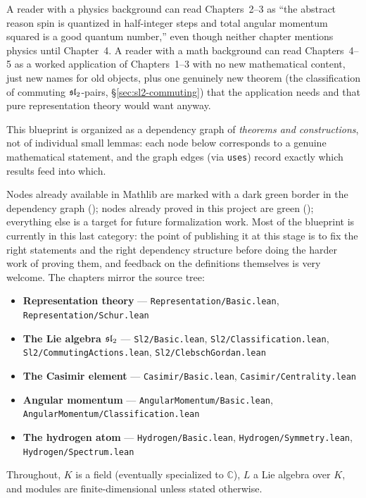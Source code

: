 A reader with a physics background can read Chapters~2--3 as ``the abstract
reason spin is quantized in half-integer steps and total angular momentum
squared is a good quantum number,'' even though neither chapter mentions
physics until Chapter~4. A reader with a math background can read Chapters~4--5
as a worked application of Chapters~1--3 with no new mathematical content,
just new names for old objects, plus one genuinely new theorem (the
classification of commuting $\mathfrak{sl}_2$-pairs, \S\ref{sec:sl2-commuting}) that
the application needs and that pure representation theory would want anyway.

This blueprint is organized as a dependency graph of \emph{theorems and
constructions}, not of individual small lemmas: each node below corresponds
to a genuine mathematical statement, and the graph edges (via \texttt{uses})
record exactly which results feed into which.

Nodes already available in Mathlib are marked with a dark green border in the
dependency graph (\mathlibok); nodes already proved in this project are
green (\leanok); everything else is a target for future formalization work.
Most of the blueprint is currently in this last category: the point of
publishing it at this stage is to fix the right statements and the right
dependency structure before doing the harder work of proving them, and
feedback on the definitions themselves is very welcome.
The chapters mirror the source tree:
\begin{itemize}
  \item \textbf{Representation theory} ---
    \texttt{Representation/Basic.lean}, \texttt{Representation/Schur.lean}
  \item \textbf{The Lie algebra $\mathfrak{sl}_2$} ---
    \texttt{Sl2/Basic.lean}, \texttt{Sl2/Classification.lean},
    \texttt{Sl2/CommutingActions.lean}, \texttt{Sl2/ClebschGordan.lean}
  \item \textbf{The Casimir element} ---
    \texttt{Casimir/Basic.lean}, \texttt{Casimir/Centrality.lean}
  \item \textbf{Angular momentum} ---
    \texttt{AngularMomentum/Basic.lean}, \texttt{AngularMomentum/Classification.lean}
  \item \textbf{The hydrogen atom} ---
    \texttt{Hydrogen/Basic.lean}, \texttt{Hydrogen/Symmetry.lean},
    \texttt{Hydrogen/Spectrum.lean}
\end{itemize}

Throughout, $K$ is a field (eventually specialized to $\mathbb{C}$), $L$ a
Lie algebra over $K$, and modules are finite-dimensional unless stated
otherwise.

